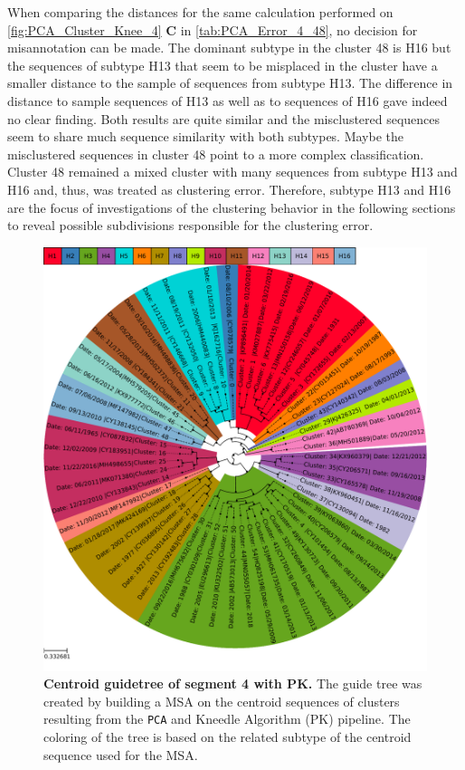 When comparing the distances for the same calculation performed on \autoref{fig:PCA_Cluster_Knee_4} \textbf{\textsf{C}} in \autoref{tab:PCA_Error_4_48}, no decision for misannotation can be made. The dominant subtype in the cluster 48 is H16 but the sequences of subtype H13 that seem to be misplaced in the cluster have a smaller distance to the sample of sequences from subtype H13. The difference in distance to sample sequences of H13 as well as to sequences of H16 gave indeed no clear finding. Both results are quite similar and the misclustered sequences seem to share much sequence similarity with both subtypes. Maybe the misclustered sequences in cluster 48 point to a more complex classification. Cluster 48 remained a mixed cluster with many sequences from subtype H13 and H16 and, thus, was treated as clustering error. Therefore, subtype H13 and H16 are the focus of investigations of the clustering behavior in the following sections to reveal possible subdivisions responsible for the clustering error.

\begin{figure}[!hbt]
    \centering
    \includegraphics[width=\textwidth]{PCA/Guidetree_segment_4_H_Centroid.pdf}
    \caption[Centroid guidetree of segment 4 with PK]{\textbf{Centroid guidetree of segment 4 with PK.} The guide tree was created by building a \gls{MSA} on the centroid sequences of clusters resulting from the \texttt{PCA} and Kneedle Algorithm (PK) pipeline. The coloring of the tree is based on the related subtype of the centroid sequence used for the \gls{MSA}.}
    \label{fig:PCA_Guidetree_Centroid_4}
\end{figure}

